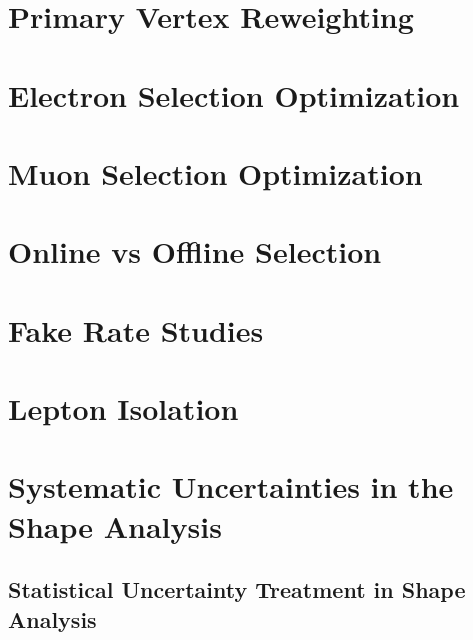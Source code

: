 \documentclass{cmspaper}
\begin{document}


\appendix
\appendixpage
  \section{Primary Vertex Reweighting}
     \label{app:vertex_reweight}
     
  \clearpage
  \section{Electron Selection Optimization}
     \label{app:els}
     
  \clearpage
  \section{Muon Selection Optimization}
     \label{app:mus}
     
  \clearpage
%     
  \clearpage
  \section{Online vs Offline Selection}
     \label{app:online_vs_offline}
     
  \clearpage
  \section{Fake Rate Studies}
     \label{app:fake_rate_studies}
     
     

  \clearpage
  \section{Lepton Isolation}
     \label{app:lepton_isolation}
     
  \clearpage

 \section{ Systematic Uncertainties in the Shape Analysis}
  \subsection{Statistical Uncertainty Treatment in Shape Analysis}
     \label{app:uncert_shapeanalysis}
     
\end{document}
